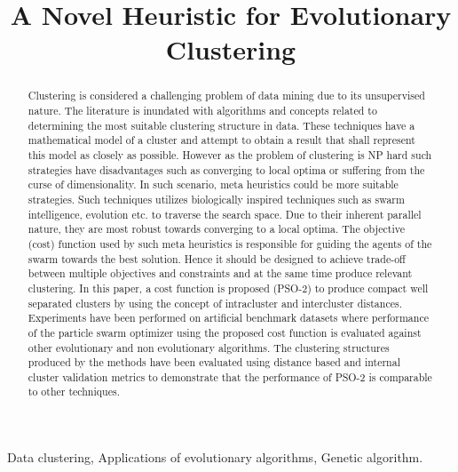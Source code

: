 \documentclass[conference]{IEEEtran}
\begin{document}
\title{A Novel Heuristic for Evolutionary Clustering}







\maketitle

\begin{abstract}
Clustering is considered a challenging problem of data mining due to its unsupervised nature. The literature is inundated with algorithms and concepts related to determining the most suitable clustering structure in data. These techniques have a mathematical model of a cluster and attempt to obtain a result that shall represent this model as closely as possible. However as the problem of clustering is NP hard such strategies have disadvantages such as converging to local optima or suffering from the curse of dimensionality. In such scenario, meta heuristics could be more suitable strategies. Such techniques utilizes biologically inspired techniques such as swarm intelligence, evolution etc. to traverse the search space. Due to their inherent parallel nature, they are most robust towards converging to a local optima. The objective (cost) function used by such meta heuristics is responsible for guiding the agents of the swarm towards the best solution. Hence it should be designed to achieve trade-off between multiple objectives and constraints and at the same time produce relevant clustering. In this paper, a cost function is proposed (PSO-2) to produce compact well separated clusters by using the concept of intracluster and intercluster distances. Experiments have been performed on artificial benchmark datasets where performance of the particle swarm optimizer using the proposed cost function is evaluated against other evolutionary and non evolutionary algorithms. The clustering structures produced by the  methods have been evaluated using distance based and internal cluster validation metrics to demonstrate that the performance of PSO-2 is comparable to other techniques.  \\
\end{abstract}

\begin{IEEEkeywords}Data clustering, Applications of evolutionary algorithms, Genetic
algorithm.    
\end{IEEEkeywords}
\end{document}
